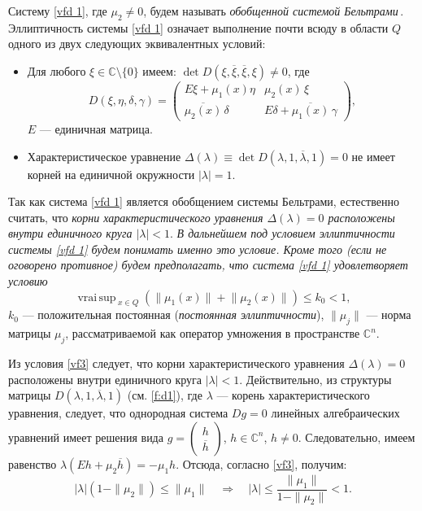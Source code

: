 Систему \eqref{vfd 1}, где $\mu_2\ne0$, будем называть \textit{обобщенной системой
Бельтрами\,}.
Эллиптичность системы \eqref{vfd 1}
означает выполнение почти всюду в области $Q$ одного из двух следующих эквивалентных условий:
\begin{itemize}
\item
Для любого $\xi\in\mathbb C\setminus\{0\}$ имеем: $\det D(\xi,\overline\xi,\overline\xi,\xi)\ne0$,
где
\begin{equation}\label{f:d1}
D(\xi,\eta,\delta,\gamma)=\left(\begin{smallmatrix}
E\xi+\mu_1(x)\eta& \mu_2(x)\,\xi\\[1mm]
\overline{\mu_2(x)}\,\delta&E\delta+\overline{\mu_1(x)}\,\gamma\end{smallmatrix}\right),
\end{equation}
$E$ --- единичная матрица.
\item
Характеристическое уравнение $\Delta(\lambda)\equiv\det D(\lambda,1,\overline\lambda,1)=0$
не имеет корней на единичной
окружности $|\lambda|=1$.
\end{itemize}
Так как система \eqref{vfd 1} является обобщением системы Бельтрами, естественно
считать, что
\textit{ корни характеристического уравнения $\Delta(\lambda)=0$ расположены
внутри единичного круга $|\lambda|<1$}.
\textit{В дальнейшем под условием эллиптичности системы  \eqref{vfd 1} будем
понимать именно это условие. Кроме того (если не оговорено противное) будем предполагать, что система \eqref{vfd 1} удовлетворяет
условию}
\begin{equation}\label{vf3}
\mathop{vrai\,sup\,}_{x\in Q}(\mathbf{\|}\mu_1(x)\mathbf{\|}+\mathbf{\|}\mu_2(x)\mathbf{\|})\leqslant k_0<1,
\end{equation}
$k_0$ --- положительная постоянная (\textit {постоянная эллиптичности}),  $ \|\mu_j\|$
--- норма матрицы $\mu_j$, рассматриваемой как оператор умножения в пространстве %
$ {\mathbb C}^n$.

Из условия \eqref{vf3} следует, что корни характеристического уравнения $\Delta(\lambda)=0$
расположены внутри единичного круга $|\lambda|<1$. Действительно, из структуры
матрицы $D(\lambda,1,\overline\lambda,1)$ (см. \eqref{f:d1}), где $\lambda$ --- корень характеристического уравнения, следует, что однородная система
$Dg=0$ линейных алгебраических уравнений имеет решения вида $g=\left(\begin{smallmatrix}h\\[0.5mm]
\overline h
\end{smallmatrix}\right)$, $h\in\mathbb{C}^n$, $h\ne0$. Следовательно, имеем
 равенство $\lambda\left(Eh+\mu_2\overline{h}\right)=-\mu_1h$. Отсюда, согласно
 \eqref{vf3}, получим:
 $$
 |\lambda|\left(1-\|\mu_2\|\right)\leqslant\|\mu_1\|\quad \Longrightarrow\quad |\lambda|\leqslant\frac{\|\mu_1\|}
 {1-\|\mu_2\|}<1.
 $$


